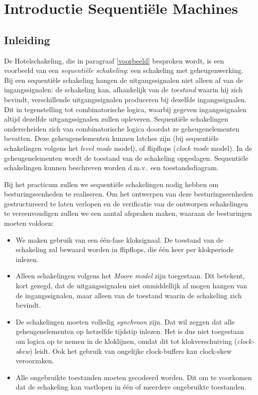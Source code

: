 \section{Introductie Sequenti\"ele Machines}
\label{intro_seq_machine}

\subsection{Inleiding}

De Hotelschakeling, die in paragraaf \ref{voorbeeld} besproken wordt, is een voorbeeld van
een {\em sequenti\"ele schakeling\/}: een schakeling met geheugenwerking.
Bij een sequenti\"ele schakeling hangen de uitgangssignalen niet alleen af van
de ingangssignalen: de schakeling kan, afhankelijk van de {\em toestand\/}
waarin hij zich bevindt, verschillende uitgangssignalen produceren bij
dezelfde ingangssignalen.
Dit in tegenstelling tot combinatorische logica, waarbij gegeven
ingangssignalen altijd dezelfde uitgangssignalen zullen opleveren.
Sequenti\"ele schakelingen onderscheiden zich van combinatorische logica
doordat ze ge\-heu\-gen\-ele\-men\-ten bevatten.
Deze geheugenelementen kunnen latches zijn (bij sequenti\"ele schakelingen
volgens het {\em level mode\/} model), of flipflops ({\em clock mode\/}
model).
In de geheugenelementen wordt de toestand
van de schakeling opgeslagen.
Sequenti\"ele schakelingen kunnen beschreven worden d.m.v.\ een
toestandsdiagram.

Bij het practicum zullen we sequenti\"ele schakelingen nodig hebben
om besturingseenheden te realiseren.
Om het ontwerpen van deze besturingseenheden gestructureerd te laten verlopen
en de verificatie van de ontworpen schakelingen te vereenvoudigen
zullen we een aantal afspraken maken, waaraan de besturingen
moeten voldoen:

\begin{itemize}
\item
We maken gebruik van een \'e\'en-fase kloksignaal. De toestand van de schakeling
zal bewaard worden in flipflops, die \'e\'en keer per klokperiode inlezen.
\item
Alleen schakelingen volgens het {\em Moore model\/} zijn toegestaan.
Dit betekent, kort gezegd, dat de uitgangssignalen niet onmiddellijk
af mogen hangen van de ingangssignalen, maar alleen van de toestand
waarin de schakeling zich bevindt.
\item
De schakelingen moeten volledig {\em synchroon\/} zijn. 
Dat wil zeggen dat alle geheugenelementen op hetzelfde tijdstip
inlezen. Het is dus niet toegestaan om logica op te nemen
in de kloklijnen, omdat dit tot klokverschuiving ({\em clock-skew\/}) 
leidt. Ook het gebruik van ongelijke clock-buffers kan
clock-skew veroorzaken.
\item
Alle ongebruikte toestanden moeten gecodeerd worden. Dit om te voorkomen
dat de schakeling kan vastlopen in \'e\'en of meerdere ongebruikte
toestanden.
\end{itemize}

